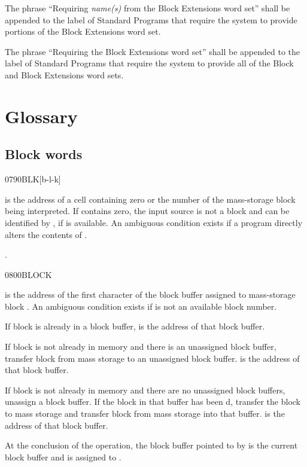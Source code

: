 The phrase ``Requiring \emph{name(s)} from the Block Extensions
word set'' shall be appended to the label of Standard Programs
that require the system to provide portions of the Block Extensions
word set.

The phrase ``Requiring the Block Extensions word set'' shall be
appended to the label of Standard Programs that require the system
to provide all of the Block and Block Extensions word sets.


\section{Glossary} %

\subsection{Block words} %

\begin{worddef}{0790}{BLK}[b-l-k]
\item {}

	 is the address of a cell containing zero or the
	number of the mass-storage block being interpreted. If
	 contains zero, the input source is not a block and
	can be identified by , if
	 is available. An ambiguous condition
	exists if a program directly alters the contents of .

\see {}.
\end{worddef}


\begin{worddef}{0800}{BLOCK}
\item {}

	 is the address of the first character of the
	block buffer assigned to mass-storage block . An
	ambiguous condition exists if  is not an available
	block number.

	If block  is already in a block buffer, 
	is the address of that block buffer.

	If block  is not already in memory and there is an
	unassigned block buffer, transfer block  from mass
	storage to an unassigned block buffer.  is the
	address of that block buffer.

	If block  is not already in memory and there are no
	unassigned block buffers, unassign a block buffer. If the block
	in that buffer has been d, transfer the block to
	mass storage and transfer block  from mass storage into
	that buffer.  is the address of that block buffer.

	At the conclusion of the operation, the block buffer pointed to
	by  is the current block buffer and is assigned to
	.
\end{worddef}


